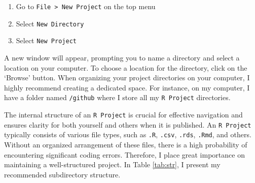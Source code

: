 \documentclass[
]{book}
\providecommand{\tightlist}{%
  \setlength{\itemsep}{0pt}\setlength{\parskip}{0pt}}
\begin{document}
\begin{enumerate}
\def\labelenumi{\alph{enumi}.}
\tightlist
\item
  Go to \texttt{File\ \textgreater{}\ New\ Project} on the top menu
\item
  Select \texttt{New\ Directory}
\item
  Select \texttt{New\ Project}
\end{enumerate}

A new window will appear, prompting you to name a directory and select a location on your computer. To choose a location for the directory, click on the `Browse' button. When organizing your project directories on your computer, I highly recommend creating a dedicated space. For instance, on my computer, I have a folder named \texttt{/github} where I store all my \texttt{R\ Project} directories.

The internal structure of an \texttt{R\ Project} is crucial for effective navigation and ensures clarity for both yourself and others when it is published. An \texttt{R\ Project} typically consists of various file types, such as \texttt{.R}, \texttt{.csv}, \texttt{.rds}, \texttt{.Rmd}, and others. Without an organized arrangement of these files, there is a high probability of encountering significant coding errors. Therefore, I place great importance on maintaining a well-structured project. In Table \ref{tab:str}, I present my recommended subdirectory structure.
\end{document}
